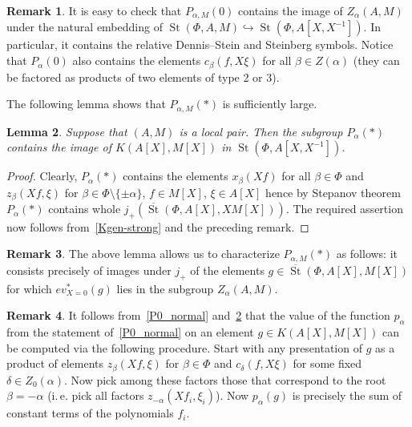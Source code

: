 \documentclass[oneside, 8pt]{amsart}
\newtheorem{lemma}{Lemma}
\theoremstyle{remark}
\theoremstyle{definition}
\numberwithin{lemma}{section}
\numberwithin{prop}{section}
\numberwithin{corollary}{section}
\numberwithin{externaltheorem}{section}
\newtheorem{rem}[lemma]{Remark}
\DeclareMathOperator{\St}{St}
\newcommand{\inv}{^{-1}}
\numberwithin{equation}{section}
\begin{document}
\begin{rem}\label{rem:c-DS} It is easy to check that $P_{\alpha, M}(0)$ contains the image of $Z_\alpha(A, M)$ under the natural embedding of $\St(\Phi, A, M) \hookrightarrow \St(\Phi, A[X, X\inv])$.
In particular, it contains the relative Dennis--Stein and Steinberg symbols.
Notice that $P_\alpha(0)$ also contains the elements $c_{\beta}(f, X\xi)$ for all $\beta \in Z(\alpha)$ (they can be factored as products of two elements of type 2 or 3). \end{rem}

The following lemma shows that $P_{\alpha, M}(*)$ is sufficiently large.
\begin{lemma} \label{Pstar-large} Suppose that $(A, M)$ is a local pair. Then the subgroup $P_\alpha(*)$ contains the image of $K(A[X], M[X])$ in $\St(\Phi, A[X, X^{-1}])$. \end{lemma}
\begin{proof} Clearly, $P_\alpha(*)$ contains the elements $x_\beta(Xf)$ for all $\beta \in \Phi$ and $z_\beta(Xf, \xi)$ for $\beta \in \Phi \setminus \{\pm \alpha\}$, $f \in M[X]$, $\xi\in A[X]$ hence by Stepanov theorem $P_\alpha(*)$ contains whole $j_+(\overline{\St}(\Phi, A[X], XM[X]))$. The required assertion now follows from~\cref{Kgen-strong} and the preceding remark. \end{proof}

\begin{rem} \label{Pstar-char} The above lemma allows us to characterize $P_{\alpha, M}(*)$ as follows: it consists precisely of images under $j_+$ of the elements 
 $g \in \overline{\St}(\Phi, A[X], M[X])$ for which $ev_{X=0}^*(g)$ lies in the subgroup $Z_\alpha(A, M)$. \end{rem} 

\begin{rem} \label{rem:palpha} It follows from~\cref{P0_normal} and~\cref{Pstar-large} that the value of the function $p_\alpha$ from the statement of~\cref{P0_normal} on an element $g\in K(A[X], M[X])$ can be computed via the following procedure. 
Start with any presentation of $g$ as a product of elements $z_{\beta}(Xf, \xi)$ for $\beta \in \Phi$ and $c_\delta(f, X\xi)$ for some fixed $\delta\in Z_0(\alpha)$. 
Now pick among these factors those that correspond to the root $\beta = -\alpha$ (i.\,e. pick all factors $z_{-\alpha}(Xf_i, \xi_i)$). 
Now $p_\alpha(g)$ is precisely the sum of constant terms of the polynomials $f_i$. \end{rem}
\end{document}
